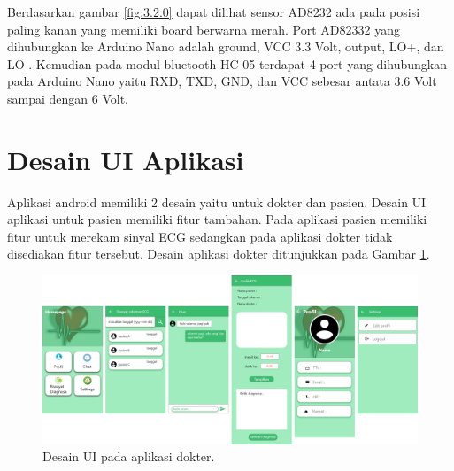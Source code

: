 Berdasarkan gambar \ref{fig:3.2.0} dapat dilihat sensor AD8232 ada pada posisi paling kanan yang memiliki board berwarna merah. Port AD82332 yang dihubungkan ke Arduino Nano adalah ground, VCC 3.3 Volt, output, LO+, dan LO-. Kemudian pada modul bluetooth HC-05 terdapat 4 port yang dihubungkan pada Arduino Nano yaitu RXD, TXD, GND, dan VCC sebesar antata 3.6 Volt sampai dengan 6 Volt. 
\section{Desain UI Aplikasi}
\vspace{1ex}
Aplikasi android memiliki 2 desain yaitu untuk dokter dan
pasien. Desain UI aplikasi untuk pasien memiliki fitur tambahan. Pada aplikasi pasien memiliki fitur untuk merekam sinyal
ECG sedangkan pada aplikasi dokter tidak disediakan fitur tersebut. Desain aplikasi dokter
ditunjukkan pada Gambar \ref{fig:3.2}.  

\begin{figure}[H] \centering
	\includegraphics[width=1\textwidth]{img/dokterUI.png}
	\caption{Desain UI pada aplikasi dokter.}
	\label{fig:3.2}
\end{figure}
\vspace{1ex}

